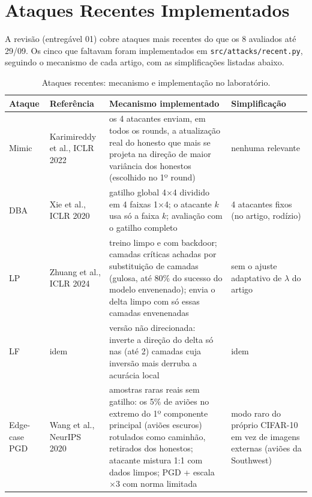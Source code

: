 \documentclass[11pt,a4paper]{article}
\begin{document}
\section{Ataques Recentes Implementados}
\label{sec:recentes}

A revisão (entregável 01) cobre ataques mais recentes do que os 8 avaliados até 29/09. Os cinco que
faltavam foram implementados em \texttt{src/attacks/recent.py}, seguindo o mecanismo de cada artigo, com
as simplificações listadas abaixo.

\begin{table}[htbp]
\centering
\footnotesize
\caption{Ataques recentes: mecanismo e implementação no laboratório.}
\label{tab:recentes}
\begin{tabular}{p{2.3cm}p{2.5cm}p{6.2cm}p{5.2cm}}
\toprule
\textbf{Ataque} & \textbf{Referência} & \textbf{Mecanismo implementado} & \textbf{Simplificação} \\
\midrule
\rowcolor{lightbg} Mimic & Karimireddy et al., ICLR 2022~\cite{mimic} & os 4 atacantes enviam, em todos os rounds, a atualização real do honesto que mais se projeta na direção de maior variância dos honestos (escolhido no 1º round) & nenhuma relevante \\
DBA & Xie et al., ICLR 2020~\cite{dba} & gatilho global 4$\times$4 dividido em 4 faixas 1$\times$4; o atacante $k$ usa só a faixa $k$; avaliação com o gatilho completo & 4 atacantes fixos (no artigo, rodízio) \\
\rowcolor{lightbg} LP & Zhuang et al., ICLR 2024~\cite{bclayers} & treino limpo e com backdoor; camadas críticas achadas por substituição de camadas (gulosa, até 80\% do sucesso do modelo envenenado); envia o delta limpo com só essas camadas envenenadas & sem o ajuste adaptativo de $\lambda$ do artigo \\
LF & idem & versão não direcionada: inverte a direção do delta só nas (até 2) camadas cuja inversão mais derruba a acurácia local & idem \\
\rowcolor{lightbg} Edge-case PGD & Wang et al., NeurIPS 2020~\cite{edgecase} & amostras raras reais sem gatilho: os 5\% de aviões no extremo do 1º componente principal (aviões escuros) rotulados como caminhão, retirados dos honestos; atacante mistura 1:1 com dados limpos; PGD + escala $\times 3$ com norma limitada & modo raro do próprio CIFAR-10 em vez de imagens externas (aviões da Southwest) \\
\bottomrule
\end{tabular}
\end{table}
\end{document}
